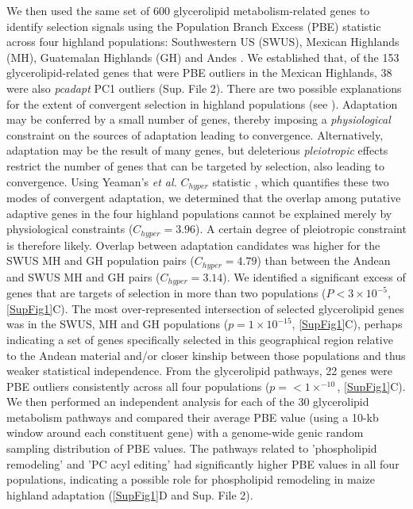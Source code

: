 \documentclass[9pt,twocolumn,twoside,lineno]{BioRxiv}
\begin{document}
We then used the same set of 600 glycerolipid metabolism-related genes to identify selection signals using the Population Branch Excess (PBE) \cite{Pool2017-oa} statistic across four highland populations: Southwestern US (SWUS), Mexican Highlands (MH), Guatemalan Highlands (GH) and Andes \cite{Wang2020-mp}.
We established that, of the 153 glycerolipid-related genes that were PBE outliers in the Mexican Highlands, 38 were also \textit{pcadapt} PC1 outliers (Sup. File 2).
There are two possible explanations for the extent of convergent selection in highland populations (see \cite{Wang2020-mp, yeaman2018}). 
Adaptation may be conferred by a small number of genes, thereby imposing a \textit{physiological} constraint on the sources of adaptation leading to convergence. 
Alternatively, adaptation may be the result of many genes, but deleterious \textit{pleiotropic} effects restrict the number of genes that can be targeted by selection, also leading to convergence.  
Using Yeaman's \textit{et al.} $C_{hyper}$ statistic \cite{yeaman2018}, which quantifies these two modes of convergent adaptation, we determined that the overlap among putative adaptive genes in the four highland populations cannot be explained merely by physiological constraints ($C_{hyper} = 3.96$). A certain degree of pleiotropic constraint is therefore likely.
Overlap between adaptation candidates was higher for the SWUS MH and GH population pairs ($C_{hyper} = 4.79$) than between the Andean and SWUS MH and GH pairs ($C_{hyper} = 3.14$).
We identified a significant excess of genes that are targets of selection in more than two populations ($P< 3 \times 10^{-5}$, \ref{SupFig1}C).
The most over-represented intersection of selected glycerolipid genes was in the SWUS, MH and GH populations ($p = 1  \times 10 ^{-15} $, \ref{SupFig1}C), perhaps indicating a set of genes specifically selected in this geographical region relative to the Andean material and/or closer kinship between those populations and thus weaker statistical independence.
From the glycerolipid pathways, 22 genes were PBE outliers consistently across all four populations ($p =<1  \times  ^{-10}$, \ref{SupFig1}C). 
We then performed an independent analysis for each of the 30 glycerolipid metabolism pathways and compared their average PBE value (using a 10-kb window around each constituent gene)  with a genome-wide genic random sampling distribution of PBE values. 
The pathways related to 'phospholipid remodeling'  and 'PC acyl editing' had significantly higher PBE values in all four populations, indicating a possible role for phospholipid remodeling in maize highland adaptation (\ref{SupFig1}D and Sup. File 2). 
\end{document}
